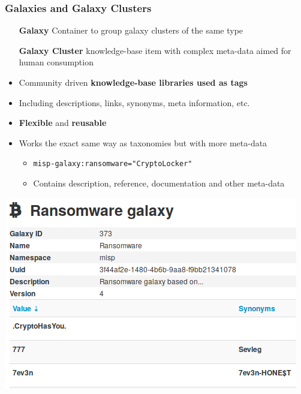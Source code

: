 \begin{frame}
    \frametitle{Galaxies and Galaxy Clusters}
    \begin{itemize}
        \item[\textbf{Galaxy}] Container to group galaxy clusters of the same type
        \item[\textbf{Galaxy Cluster}] knowledge-base item with complex meta-data aimed for human consumption
    \end{itemize}
    \begin{itemize}
        \item Community driven \textbf{knowledge-base libraries used as tags}
        \item Including descriptions, links, synonyms, meta information, etc. 
        \item \textbf{Flexible} and \textbf{reusable}
        \item Works the exact same way as taxonomies but with more meta-data
        \begin{itemize}
            \item \texttt{misp-galaxy:ransomware="CryptoLocker"}
            \item Contains description, reference, documentation and other meta-data
        \end{itemize}
    \end{itemize}
    \includegraphics[scale=1.0]{pictures/galaxy-ransomware.png}
\end{frame}


